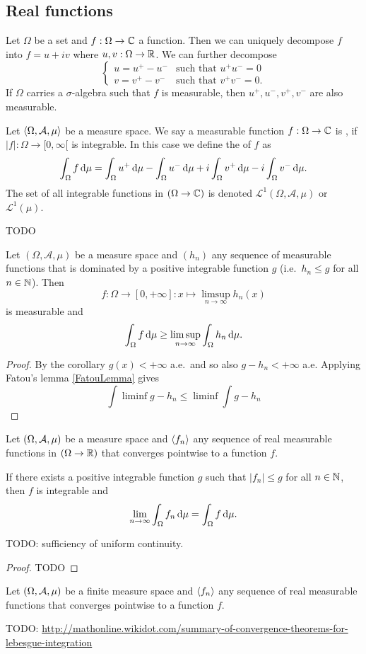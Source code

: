 \subsection{Real functions}
Let $\Omega$ be a set and $f:\Omega \to \mathbb{C}$ a function.  Then we can uniquely decompose $f$ into $f= u+iv$ where $u,v: \Omega\to \mathbb{R}$. We can further decompose
\[ \begin{cases}
u = u^+ - u^- & \text{such that $u^+u^- = 0$} \\
v = v^+ - v^- & \text{such that $v^+v^- = 0$.}
\end{cases} \]
If $\Omega $ carries a $\sigma$-algebra such that $f$ is measurable, then $u^+,u^-,v^+,v^-$ are also measurable.
\begin{definition}
Let $\left\langle \Omega, \mathcal{A},\mu \right\rangle$ be a measure space. We say a measurable function $f: \Omega \to \mathbb{C}$ is , if $|f|:\Omega\to [0,\infty[$ is integrable. In this case we define the  of $f$ as
\[ \int_\Omega f\operatorname{d \!}{\mu} = \int_\Omega u^+\operatorname{d \!}{\mu} - \int_\Omega u^-\operatorname{d \!}{\mu} + i\int_\Omega v^+\operatorname{d \!}{\mu} - i\int_\Omega v^-\operatorname{d \!}{\mu}. \]
The set of all integrable functions in $(\Omega \to \mathbb{C})$ is denoted $\mathcal{L} ^1(\Omega,\mathcal{A},\mu)$ or $\mathcal{L} ^1(\mu)$.
\end{definition}

TODO
\begin{proposition}
Let $(\Omega, \mathcal{A}, \mu)$ be a measure space and $(h_n)$ any sequence of measurable functions that is dominated by a positive integrable function $g$ (i.e.\ $h_n\leq g$ for all $n\in\mathbb{N}$). Then
\[ f: \Omega\to[0,+\infty]: x\mapsto \limsup_{n\to\infty}h_n(x) \]
is measurable and
\[ \int_\Omega f\operatorname{d \!}{\mu} \geq \limsup_{n\to\infty}\int_\Omega h_n\operatorname{d \!}{\mu}. \]
\end{proposition}
\begin{proof}
By the corollary $g(x)<+\infty$ a.e.\ and so also $g-h_n<+\infty$ a.e. Applying Fatou's lemma \ref{FatouLemma} gives
\[ \int\liminf g-h_n \leq \liminf\int g-h_n\]
\end{proof}

\begin{theorem}
Let $\left( \Omega, \mathcal{A}, \mu \right)$ be a measure space and $\left\langle f_n \right\rangle$ any sequence of real measurable functions in $(\Omega\to\mathbb{R})$ that converges pointwise to a function $f$.

If there exists a positive integrable function $g$ such that $|f_n| \leq g$ for all $n\in \mathbb{N}$, then $f$ is integrable and
\[ \lim_{n\to \infty}\int_\Omega f_n \operatorname{d \!}{\mu} = \int_\Omega f\operatorname{d \!}{\mu}. \]
\end{theorem}
TODO: sufficiency of uniform continuity.
\begin{proof}
TODO
\end{proof}
\begin{corollary} \label{boundedConvergenceTheorem}
Let $\left( \Omega, \mathcal{A}, \mu \right)$ be a finite measure space and $\left\langle f_n \right\rangle$ any sequence of real measurable functions that converges pointwise to a function $f$.
\end{corollary}
TODO: \url{http://mathonline.wikidot.com/summary-of-convergence-theorems-for-lebesgue-integration}


